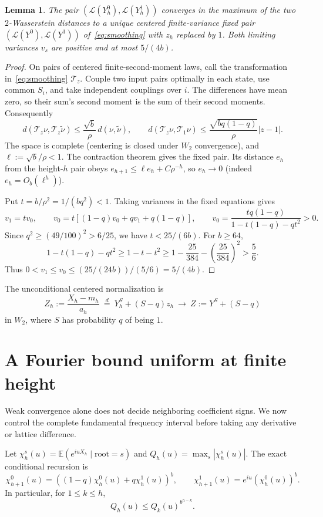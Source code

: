 \documentclass[11pt]{article}
\newtheorem{lemma}[theorem]{Lemma}
\newcommand{\E}{\mathbb E}
\newcommand{\Law}{\mathcal L}
\begin{document}
\begin{lemma}\label{lem:contraction}
The pair $(\Law(Y_h^0),\Law(Y_h^1))$ converges in the maximum of the two
$2$-Wasserstein distances to a unique centered finite-variance fixed pair
$(\Law(Y^0),\Law(Y^1))$ of~\eqref{eq:smoothing} with $z_h$ replaced by $1$.
Both limiting variances $v_s$ are positive and at most $5/(4b)$.
\end{lemma}
\begin{proof}
On pairs of centered finite-second-moment laws, call the transformation
in~\eqref{eq:smoothing} $\mathcal T_z$. Couple two input pairs optimally
in each state, use common $S_i$, and take independent couplings over $i$.
The differences have mean zero, so their sum's second moment is the sum
of their second moments. Consequently
\[
 d(\mathcal T_z\nu,\mathcal T_z\widetilde\nu)
 \le \frac{\sqrt b}{\rho}\,d(\nu,\widetilde\nu),\qquad
 d(\mathcal T_z\nu,\mathcal T_1\nu)
 \le\frac{\sqrt{bq(1-q)}}{\rho}|z-1|.
\]
The space is complete (centering is closed under $W_2$ convergence),
and $\ell:=\sqrt b/\rho<1$. The contraction theorem gives the fixed pair.
Its distance $e_h$ from the height-$h$ pair obeys
$e_{h+1}\le\ell e_h+C\rho^{-h}$, so $e_h\to0$ (indeed
$e_h=O_b(\ell^h)$).

Put $t=b/\rho^2=1/(bq^2)<1$. Taking variances in the fixed equations gives
\[
 v_1=tv_0,\qquad
 v_0=t[(1-q)v_0+qv_1+q(1-q)],
 \qquad
 v_0=\frac{tq(1-q)}{1-t(1-q)-qt^2}>0.
\]
Since $q^2\ge(49/100)^2>6/25$, we have $t<25/(6b)$.
For $b\ge64$,
\[
 1-t(1-q)-qt^2\ge1-t-t^2
 \ge1-\frac{25}{384}-\left(\frac{25}{384}\right)^2>\frac56.
\]
Thus $0<v_1\le v_0\le (25/(24b))/(5/6)=5/(4b)$.
\end{proof}

The unconditional centered normalization is
\begin{equation}\label{eq:Z}
 Z_h:=\frac{X_h-m_h}{a_h}\ \overset d=\ Y_h^S+(S-q)z_h
 \ \longrightarrow\ Z:=Y^S+(S-q)
\end{equation}
in $W_2$, where $S$ has probability $q$ of being $1$.

\section{A Fourier bound uniform at finite height}
Weak convergence alone does not decide neighboring coefficient signs.
We now control the complete fundamental frequency interval before taking
any derivative or lattice difference.

Let $\chi_h^s(u)=\E(e^{iuX_h}\mid\text{root}=s)$ and
$Q_h(u)=\max_s|\chi_h^s(u)|$. The exact conditional recursion is
\begin{equation}\label{eq:fourierrec}
 \chi_{h+1}^0(u)=((1-q)\chi_h^0(u)+q\chi_h^1(u))^b,
 \qquad \chi_{h+1}^1(u)=e^{iu}(\chi_h^0(u))^b.
\end{equation}
In particular, for $1\le k\le h$,
\begin{equation}\label{eq:amplify}
 Q_h(u)\le Q_k(u)^{b^{h-k}}.
\end{equation}
\end{document}
